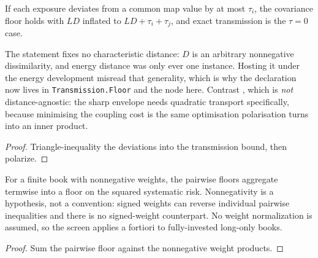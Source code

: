 \begin{corollary}
  \label{cor:approximate-map-bound}
  If each exposure deviates from a common map value by at most \(\tau_i\), the
  covariance floor holds with \(LD\) inflated to \(LD+\tau_i+\tau_j\), and exact
  transmission is the \(\tau=0\) case.

  The statement fixes no characteristic distance: \(D\) is an arbitrary
  nonnegative dissimilarity, and energy distance was only ever one instance.
  Hosting it under the energy development misread that generality, which is why
  the declaration now lives in \texttt{Transmission.Floor} and the node here.
  Contrast , which is \emph{not}
  distance-agnostic: the sharp envelope needs quadratic transport specifically,
  because minimising the coupling cost is the same optimisation polarisation
  turns into an inner product.
\end{corollary}

\begin{proof}
  Triangle-inequality the deviations into the transmission bound, then polarize.
\end{proof}

\begin{theorem}
  \label{eq:portfolio-envelope}
  For a finite book with nonnegative weights, the pairwise floors aggregate
  termwise into a floor on the squared systematic risk.
  Nonnegativity is a hypothesis, not a convention: signed weights can reverse
  individual pairwise inequalities and there is no signed-weight counterpart.
  No weight normalization is assumed, so the screen applies a fortiori to
  fully-invested long-only books.

\end{theorem}

\begin{proof}
  Sum the pairwise floor against the nonnegative weight products.
\end{proof}
